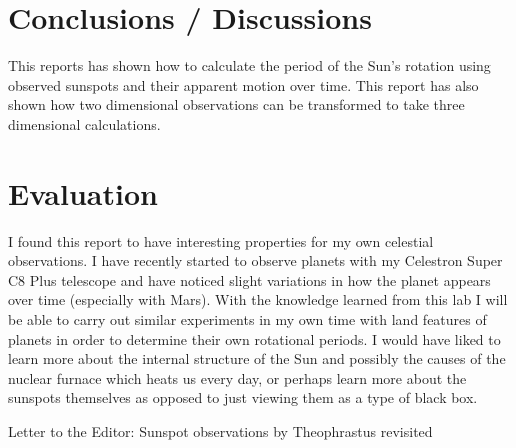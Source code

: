 \documentclass{article}
\begin{document}

\section{Conclusions / Discussions}

This reports has shown how to calculate the period of the Sun's rotation using observed sunspots and their
apparent motion over time. This report has also shown how two dimensional observations can be
transformed to take three dimensional calculations.


\section{Evaluation}

I found this report to have interesting properties for my own celestial observations. I have recently started to
observe planets with my Celestron Super C8 Plus telescope and have noticed slight variations in how the planet
appears over time (especially with Mars). With the knowledge learned from this lab I will be able to carry out
similar experiments in my own time with land features of planets in order to determine their own rotational periods.
I would have liked to learn more about the internal structure of the Sun and possibly the causes of the nuclear furnace
which heats us every day, or perhaps learn more about the sunspots themselves as opposed to just viewing them
as a type of black box.



\begin{thebibliography}{9}

Letter to the Editor: Sunspot observations by Theophrastus revisited

\end{thebibliography}
\end{document}
